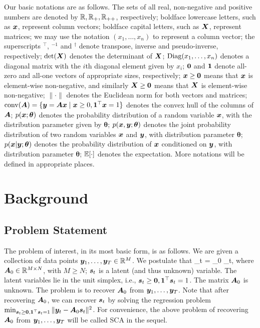 \documentclass[10pt,twocolumn,twoside]{IEEEtran}
\begin{document}
Our basic notations are as follows.
The sets of all real, non-negative and positive numbers are denoted by $\mathbb{R}, \mathbb{R}_+, \mathbb{R}_{++}$, respectively;
boldface lowercase letters, such as ${\bm x}$, represent column vectors;
boldface capital letters, such as ${\bm X}$, represent matrices;
we may use the notation $(x_1,\ldots,x_n)$ to represent a column vector;
the superscripts $^\top$, $^{-1}$ and $^\dag$ denote transpose, inverse and pseudo-inverse, respectively;
$\det({\bm X})$ denotes the determinant of ${\bm X}$;
$\mathrm{Diag}(x_1,\ldots,x_n)$ denotes a diagonal matrix with the $i$th diagonal element given by $x_i$;
${\bm 0}$ and ${\bm 1}$ denote all-zero and all-one vectors of appropriate sizes, respectively;
${\bm x} \geq {\bm 0}$ means that ${\bm x}$ is element-wise non-negative,
and similarly ${\bm X} \geq {\bm 0}$ means that ${\bm X}$ is element-wise non-negative;
$\| \cdot \|$ denotes the Euclidean norm for both vectors and matrices;
${\rm conv}({\bm A})= \{ {\bm y} = {\bm A} {\bm x} \mid {\bm x} \geq 0, {\bm 1}^\top {\bm x} = 1 \}$ denotes the convex hull of the columns of ${\bm A}$;
$ p({\bm x};\bm \theta)$ denotes the probability distribution of a random variable $ {\bm x} $, with the distribution parameter given by $ \bm\theta $;
$ p({\bm x},{\bm y};\bm \theta)$ denotes the joint probability distribution of two random variables $ {\bm x} $ and $ {\bm y} $, with distribution parameter $\bm \theta $;
$ p({\bm x} | {\bm y};\bm\theta)$ denotes the probability distribution of $ {\bm x} $ conditioned on $ {\bm y} $, with distribution parameter $ \bm \theta $;
$\mathbb{E}[ \cdot ]$ denotes the expectation.
More notations will be defined in appropriate places.




\section{Background}

\subsection{Problem Statement}
\label{sect:prob_stat}

The problem of interest, in its most basic form, is as follows.
We are given a collection of data points ${\bm y}_1,\ldots,{\bm y}_T \in \mathbb{R}^M$.
We postulate that
\beq \label{eq:basic_model}
\by_t = \bA_0 \bs_t,
\eeq
where ${\bm A}_0 \in \mathbb{R}^{M \times N}$, with $M \geq N$;
${\bm s}_t$ is a latent (and thus unknown) variable.
The latent variables lie in the unit simplex, i.e., ${\bm s}_t \geq {\bm 0}, {\bm 1}^\top {\bm s}_t = 1$.
The matrix ${\bm A}_0$ is unknown.
The problem is to recover ${\bm A}_0$ from ${\bm y}_1,\ldots,{\bm y}_T$.
Note that after recovering ${\bm A}_0$, we can recover ${\bm s}_t$ by solving the regression problem $\min_{{\bm s}_t \geq {\bm 0},  {\bm 1}^\top {\bm s}_t=1} \| {\bm y}_t - {\bm A}_0 {\bm s}_t \|^2$.
For convenience, the above problem of recovering ${\bm A}_0$ from ${\bm y}_1,\ldots,{\bm y}_T$ will be called SCA in the sequel.
\end{document}
